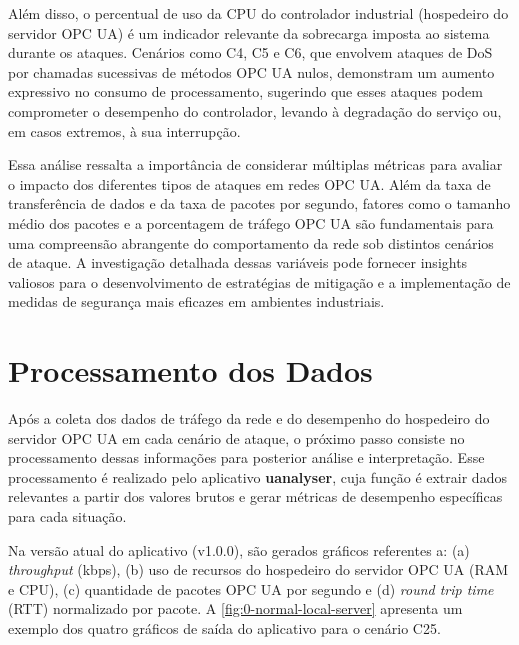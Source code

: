     Além disso, o percentual de uso da CPU do controlador industrial (hospedeiro do servidor OPC UA) é um indicador relevante da sobrecarga imposta ao sistema durante os ataques. Cenários como C4, C5 e C6, que envolvem ataques de DoS por chamadas sucessivas de métodos OPC UA nulos, demonstram um aumento expressivo no consumo de processamento, sugerindo que esses ataques podem comprometer o desempenho do controlador, levando à degradação do serviço ou, em casos extremos, à sua interrupção.

    Essa análise ressalta a importância de considerar múltiplas métricas para avaliar o impacto dos diferentes tipos de ataques em redes OPC UA. Além da taxa de transferência de dados e da taxa de pacotes por segundo, fatores como o tamanho médio dos pacotes e a porcentagem de tráfego OPC UA são fundamentais para uma compreensão abrangente do comportamento da rede sob distintos cenários de ataque. A investigação detalhada dessas variáveis pode fornecer insights valiosos para o desenvolvimento de estratégias de mitigação e a implementação de medidas de segurança mais eficazes em ambientes industriais.

\section{Processamento dos Dados} \label{sec:processamento-dados}

    Após a coleta dos dados de tráfego da rede e do desempenho do hospedeiro do servidor OPC UA em cada cenário de ataque, o próximo passo consiste no processamento dessas informações para posterior análise e interpretação. Esse processamento é realizado pelo aplicativo \textbf{uanalyser}, cuja função é extrair dados relevantes a partir dos valores brutos e gerar métricas de desempenho específicas para cada situação.

    Na versão atual do aplicativo (v1.0.0), são gerados gráficos referentes a: (a) \textit{throughput} (kbps), (b) uso de recursos do hospedeiro do servidor OPC UA (RAM e CPU), (c) quantidade de pacotes OPC UA por segundo e (d) \textit{round trip time} (RTT) normalizado por pacote. A \autoref{fig:0-normal-local-server} apresenta um exemplo dos quatro gráficos de saída do aplicativo para o cenário C25.


